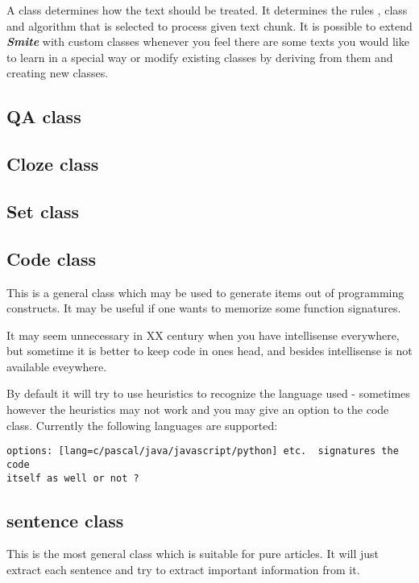 \documentclass[a4paper,11pt]{article}
\newcommand{\smite}{\emph{\textbf{Smite{}}}}
\begin{document}
A class determines how the text should be treated. It determines the rules ,
class and algorithm that is selected to process given text chunk.  It is
possible to extend \smite{} with custom classes whenever you feel there are
some texts you would like to learn in a special way or modify existing classes
by deriving from them and creating new classes.

\subsection{QA class}
\subsection{Cloze class}
\subsection{Set class}
\subsection{Code class}

This is a general class which may be used to generate items out of programming
constructs. It may be useful if one wants to memorize some function signatures.

It may seem unnecessary in XX century when you have intellisense everywhere,
but sometime it is better to keep code in ones head, and besides intellisense
is not available eveywhere.

By default it will try to use heuristics to recognize the language used -
sometimes however the heuristics may not work and you may give an option to the
code class.  Currently the following languages are supported:

\begin{verbatim}
options: [lang=c/pascal/java/javascript/python] etc.  signatures the code
itself as well or not ?
\end{verbatim}



\subsection{sentence class}

This is the most general class which is suitable for pure articles.  It will
just extract each sentence and try to extract important information from it.
\end{document}
